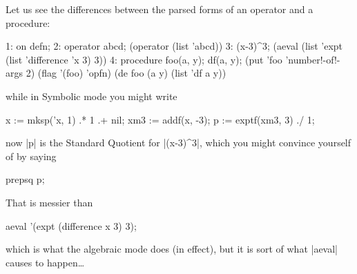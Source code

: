 \documentclass[12pt,twoside,openright]{memoir}
\begin{document}
Let us see the differences between the parsed forms of an operator and a
procedure:
\begin{rlispverb}
1: on defn;
2: operator abcd;
    (operator (list 'abcd))
3: (x-3)^3;
    (aeval (list 'expt (list 'difference 'x 3) 3))
4: procedure foo(a, y); df(a, y);
    (put 'foo 'number!-of!-args 2)
    (flag '(foo) 'opfn)
    (de foo (a y) (list 'df a y))
\end{rlispverb}
while in Symbolic mode you might write
\begin{rlispverb}
  x := mksp('x, 1) .* 1 .+ nil; %
  xm3 := addf(x, -3); %
  p := exptf(xm3, 3) ./ 1; %
\end{rlispverb}
now |p| is the Standard Quotient for |(x-3)^3|, which you might convince
yourself of by saying
\begin{rlispverb}
  prepsq p;
\end{rlispverb}

That is messier than
\begin{rlispverb}
  aeval '(expt (difference x 3) 3);
\end{rlispverb}
which is what the algebraic mode does (in effect), but it is sort of what
|aeval| causes to happen\dots
\end{document}
